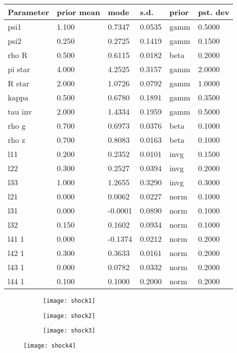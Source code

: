 \documentclass[]{article}
\begin{document}
\begin{table}[H]	
	\centering
	\begin{tabular}{llllll}
		Parameter & prior mean & mode   & s.d.   & prior & pst. dev \\
		\hline 
		psi1 & 1.100     & 0.7347 & 0.0535 & gamm & 0.5000 \\
		psi2 & 0.250 & 0.2725 & 0.1419 & gamm & 0.1500 \\
		rho R & 0.500 & 0.6115 & 0.0182 & beta & 0.2000 \\
		pi star & 4.000 & 4.2525 & 0.3157 & gamm & 2.0000 \\
		R star & 2.000 & 1.0726 & 0.0792 & gamm & 1.0000 \\
		kappa & 0.500 & 0.6780 & 0.1891 & gamm & 0.3500 \\
		tau inv & 2.000 & 1.4334 & 0.1959 & gamm & 0.5000 \\
		rho g & 0.700 & 0.6973 & 0.0376 & beta & 0.1000 \\
		rho z & 0.700 & 0.8083 & 0.0163 & beta & 0.1000 \\
		l11 & 0.200 & 0.2352 & 0.0101 & invg & 0.1500 \\
		l22 & 0.300 & 0.2527 & 0.0394 & invg & 0.2000 \\
		l33 & 1.000 & 1.2655 & 0.3290 & invg & 0.3000 \\
		l21 & 0.000 & 0.0062 & 0.0227 & norm & 0.1000 \\
		l31 & 0.000 & -0.0001 & 0.0890 & norm & 0.1000 \\
		l32 & 0.150 & 0.1602 & 0.0934 & norm & 0.1000 \\
		l41 1 & 0.000 & -0.1374 & 0.0212 & norm & 0.2000 \\
		l42 1 & 0.300 & 0.3633 & 0.0161 & norm & 0.2000 \\
		l43 1 & 0.000 & 0.0782 & 0.0332 & norm & 0.2000 \\
		l44 1 & 0.100 & 0.1000 & 0.2000 & norm & 0.2000 \\
		\hline 
	\end{tabular}	
\end{table}

	\begin{figure}[H]
		\begin{subfigure}{.3\textwidth}
			\texttt{[image: shock1]}
		\end{subfigure}
		\begin{subfigure}{.3\textwidth}
			\texttt{[image: shock2]}
		\end{subfigure}
				\begin{subfigure}{.3\textwidth}
					\texttt{[image: shock3]}
				\end{subfigure}
	\end{figure}
	\begin{figure}
		\centering
		\texttt{[image: shock4]}
	\end{figure}
\end{document}
